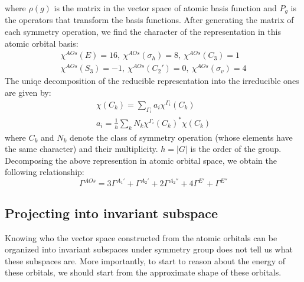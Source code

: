 \documentclass{article}
\begin{document}
where $\rho(g)$ is the matrix in the vector space of atomic basis function and $P_g$ is the 
operators that transform the basis functions. 
After generating the matrix of each symmetry operation, we find the character of the representation
in this atomic orbital basis:
\begin{gather*}
    \chi^{AOs}(E) = 16,\ \chi^{AOs}(\sigma_h) = 8,\ \chi^{AOs}(C_3) = 1\\ 
    \chi^{AOs}(S_3) = -1,\ \chi^{AOs}(C_2') = 0,\ \chi^{AOs}(\sigma_v) = 4
\end{gather*}
The uniqe decomposition of the reducible representation into the irreducible ones are given by:
\begin{gather}
    \chi(C_k) = \sum_{\Gamma_i} a_i \chi^{\Gamma_i}(C_k) \\
    a_i = \frac{1}{h} \sum_{k} N_k \chi^{\Gamma_i}(C_k)^* \chi(C_k)
\end{gather}
where $C_k$ and $N_k$ denote the class of symmetry operation (whose elements have the same character)
and their multiplicity. $h = |G|$ is the order of the group. Decomposing the 
above represention in atomic orbital space, we obtain the following relationship:
\begin{equation}
    \Gamma^{AOs} = 
      3\Gamma^{A_1'} + \Gamma^{A_2'}  + 2\Gamma^{A_2''} + 4\Gamma^{E'} + \Gamma^{E''}
\end{equation}

\subsection{Projecting into invariant subspace}
Knowing who the vector space constructed from the atomic orbitals can be organized into invariant subspaces 
under symmetry group does not tell us what these subspaces are. 
More importantly, to start to reason about the energy of these orbitals, we should start from the approximate
shape of these orbitals.
\end{document}
